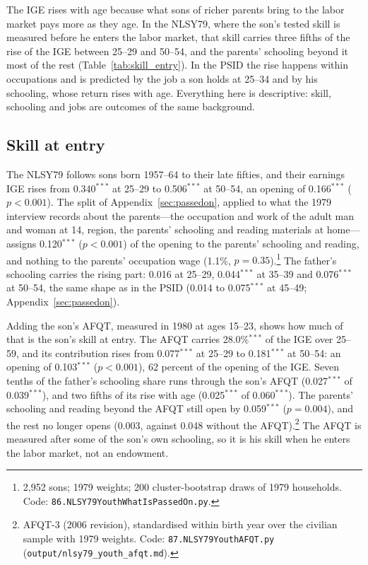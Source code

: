 
The IGE rises with age because what sons of richer parents bring to the labor market pays more as they age. In the
NLSY79, where the son's tested skill is measured before he enters the labor market, that skill carries three fifths of
the rise of the IGE between 25--29 and 50--54, and the parents' schooling beyond it most of the rest
(Table~\ref{tab:skill_entry}). In the PSID the rise happens within occupations and is predicted by the job a son holds
at 25--34 and by his schooling, whose return rises with age. Everything here is descriptive: skill, schooling and jobs
are outcomes of the same background.

\subsection{Skill at entry}

The NLSY79 follows sons born 1957--64 to their late fifties, and their earnings IGE rises from 0.340$^{***}$ at 25--29 to
0.506$^{***}$ at 50--54, an opening of 0.166$^{***}$ ($p<0.001$). The split of Appendix~\ref{sec:passedon}, applied to what
the 1979 interview records about the parents---the occupation and work of the adult man and woman at 14, region, the
parents' schooling and reading materials at home---assigns 0.120$^{***}$ ($p<0.001$) of the opening to the parents'
schooling and reading, and nothing to the parents' occupation wage (1.1\%, $p = 0.35$).\footnote{2,952 sons; 1979
weights; 200 cluster-bootstrap draws of 1979 households. Code: \texttt{86.NLSY79YouthWhatIsPassedOn.py}.} The father's
schooling carries the rising part: 0.016 at 25--29, 0.044$^{***}$ at 35--39 and 0.076$^{***}$ at 50--54, the same shape as
in the PSID (0.014 to 0.075$^{***}$ at 45--49; Appendix~\ref{sec:passedon}).

Adding the son's AFQT, measured in 1980 at ages 15--23, shows how much of that is the son's skill at entry. The AFQT
carries 28.0\%$^{***}$ of the IGE over 25--59, and its contribution rises from 0.077$^{***}$ at 25--29 to 0.181$^{***}$ at
50--54: an opening of 0.103$^{***}$ ($p<0.001$), 62 percent of the opening of the IGE. Seven tenths of the father's
schooling share runs through the son's AFQT (0.027$^{***}$ of 0.039$^{***}$), and two fifths of its rise with age
(0.025$^{***}$ of 0.060$^{***}$). The parents' schooling and reading beyond the AFQT still open by 0.059$^{***}$
($p = 0.004$), and the rest no longer opens (0.003, against 0.048 without the AFQT).\footnote{AFQT-3 (2006 revision),
standardised within birth year over the civilian sample with 1979 weights. Code: \texttt{87.NLSY79YouthAFQT.py}
(\texttt{output/nlsy79\_youth\_afqt.md}).} The AFQT is measured after some of the son's own schooling, so it is his
skill when he enters the labor market, not an endowment.

